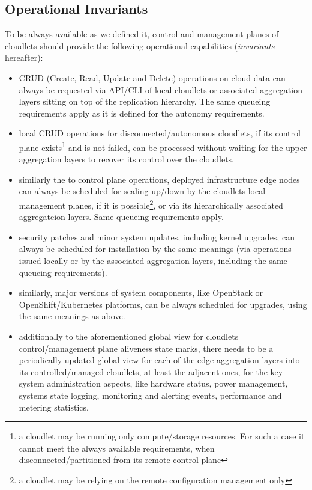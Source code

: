 \documentclass[conference]{IEEEtran}
\begin{document}
\subsection{Operational Invariants}

To be always available as we defined it, control and management planes of
cloudlets should provide the following operational capabilities
(\textit{invariants} hereafter):

\begin{itemize}
  \item CRUD (Create, Read, Update and Delete) operations on cloud data can
    always be requested via API/CLI of local cloudlets or associated aggregation
    layers sitting on top of the replication hierarchy. The same queueing
    requirements apply as it is defined for the autonomy requirements.
  \item local CRUD operations for disconnected/autonomous cloudlets, if its
    control plane exists\footnote{a cloudlet may be running only
    compute/storage resources. For such a case it cannot meet the always
    available requirements, when disconnected/partitioned from its remote
    control plane} and is not failed, can be processed without waiting for the
    upper aggregation layers to recover its control over the cloudlets.
  \item similarly the to control plane operations, deployed infrastructure edge
    nodes can always be scheduled for scaling up/down by the cloudlets local
    management planes, if it is possible\footnote{a cloudlet may be relying on
    the remote configuration management only}, or via its hierarchically
    associated aggregateion layers. Same queueing requirements apply.
  \item security patches and minor system updates, including kernel upgrades,
    can always be scheduled for installation by the same meanings (via
    operations issued locally or by the associated aggregation layers,
    including the same queueing requirements).
  \item similarly, major versions of system components, like OpenStack or
    OpenShift/Kubernetes platforms, can be always scheduled for upgrades, using
    the same meanings as above.
  \item additionally to the aforementioned global view for cloudlets
    control/management plane aliveness state marks, there needs to be a
    periodically updated global view for each of the edge aggregation layers
    into its controlled/managed cloudlets, at least the adjacent ones, for
    the key system administration aspects, like hardware status,
    power management, systems state logging, monitoring and alerting events,
    performance and metering statistics.
\end{itemize}
\end{document}
